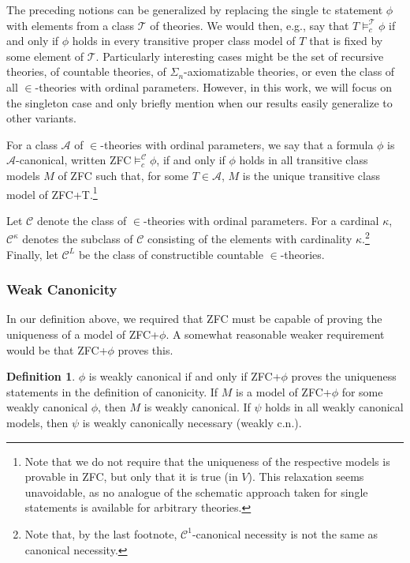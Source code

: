 \documentclass[a4paper,12pt]{amsart}
\theoremstyle{definition}
\newtheorem{defini}[fact]{Definition}
\begin{document}
The preceding notions can be generalized by replacing the single tc statement $\phi$ with elements from a class $\mathcal{T}$ of theories. We would then, e.g., say that $T\models_{c}^{\mathcal{T}}\phi$ if and only if $\phi$ holds in every transitive proper class model of $T$ that is fixed by some element of $\mathcal{T}$. 
Particularly interesting cases might be the set of recursive theories, of countable theories, of $\Sigma_n$-axiomatizable theories, or even the class of all $\in$-theories with ordinal parameters.
However, in this work, we will focus on the singleton case and only briefly mention when our results easily generalize to other variants.  




For a class $\mathcal{A}$ of $\in$-theories with ordinal parameters, we say that a formula $\phi$ is %
$\mathcal{A}$-canonical, written ZFC$\models_{c}^{\mathcal{C}}\phi$, if and only if $\phi$ holds in all transitive class models $M$ of ZFC such that, for some $T\in\mathcal{A}$, $M$ is the unique transitive class model of ZFC+T.\footnote{Note that we do not require that the uniqueness of the respective models is provable in ZFC, but only that it is true (in $V$). This relaxation seems unavoidable, as no analogue of the schematic approach taken for single statements is available for arbitrary theories. }


Let $\mathcal{C}$ denote the class of %
$\in$-theories with ordinal parameters. 
For a cardinal $\kappa$, $\mathcal{C}^{\kappa}$ denotes the subclass of $\mathcal{C}$ consisting of the elements with cardinality $\kappa$.\footnote{Note that, by the last footnote, $\mathcal{C}^{1}$-canonical necessity is not the same as canonical necessity.} 
Finally, let $\mathcal{C}^{L}$ be the class of constructible countable $\in$-theories.

\subsubsection{Weak Canonicity}

In our definition above, we required that ZFC must be capable of proving
the uniqueness of a model of ZFC+$\phi$. A somewhat reasonable weaker requirement would be that ZFC+$\phi$ proves this.

\begin{defini}
 $\phi$ is weakly canonical if and only if ZFC+$\phi$ proves the uniqueness statements in the definition of canonicity. If $M$ is a model of ZFC+$\phi$
for some weakly canonical $\phi$, then $M$ is weakly canonical. If $\psi$ holds in all weakly canonical models, then $\psi$ is weakly canonically necessary (weakly c.n.).
\end{defini}
\end{document}
